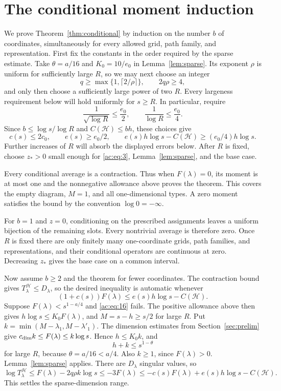 \section{The conditional moment induction}\label{sec:induction}
\label{ac:part:148}


We prove Theorem~\ref{thm:conditional} by induction on the number \(b\)
of coordinates, simultaneously for every allowed grid, path family, and
representation. First fix the constants in the order required by the
sparse estimate. Take \(\theta=a/16\) and \(K_0=10/e_0\) in
Lemma~\ref{lem:sparse}. Its exponent \(\rho\) is uniform for sufficiently
large \(R\), so we may next choose an integer
\[
 q\ge\max\{1,\lceil2/\rho\rceil\},\qquad 2q\rho\ge4,
\]
and only then choose a sufficiently large power of two \(R\). Every
largeness requirement below will hold uniformly for \(s\ge R\). In
particular, require
\[
 \frac1{\sqrt{\log R}}\le\frac{e_0}{2},
 \qquad
 \frac1{\log R}\le\frac{e_0}{4}.
\]
Since \(b\le\log s/\log R\) and \(C(\mathcal H)\le bh\), these choices give
\[
 c(s)\le2c_0,\qquad e(s)\ge e_0/2,\qquad
 e(s)h\log s-C(\mathcal H)\ge(e_0/4)h\log s.
\]
Further increases of \(R\) will absorb the displayed errors below.
After \(R\) is fixed, choose \(z_*>0\) small enough for
\eqref{ac:eq:3}, Lemma~\ref{lem:sparse}, and the base case.

Every conditional average is a contraction. Thus when \(F(\lambda)=0\),
its moment is at most one and the nonnegative allowance above proves the
theorem. This covers the empty diagram, \(M=1\), and all one-dimensional
types. A zero moment satisfies the bound by the convention
\(\log0=-\infty\).

For \(b=1\) and \(z=0\), conditioning on the prescribed assignments
leaves a uniform bijection of the remaining slots. Every nontrivial
average is therefore zero. Once \(R\) is fixed there are only finitely
many one-coordinate grids, path families, and representations, and their
conditional operators are continuous at zero. Decreasing \(z_*\) gives
the base case on a common interval.

Now assume \(b\ge2\) and the theorem for fewer coordinates. The contraction
bound gives \(T_\lambda^{\mathcal H}\le D_\lambda\), so the desired
inequality is automatic whenever
\begin{equation}
 (1+c(s))F(\lambda)\le e(s)h\log s-C(\mathcal H).
 \label{ac:eq:16}
\end{equation}
Suppose \(F(\lambda)<s^{1-a/4}\) and \eqref{ac:eq:16} fails. The positive
allowance above then gives
\(h\log s\le K_0F(\lambda)\), and \(M=s-h\ge s/2\) for large \(R\).
Put \(k=\min(M-\lambda_1,M-\lambda'_1)\). The dimension estimates from
Section~\ref{sec:prelim} give
\(c_{\rm dim}k\le F(\lambda)\le k\log s\). Hence \(h\le K_0k\), and
\[
 h+k\le s^{1-\theta}
\]
for large \(R\), because \(\theta=a/16<a/4\). Also \(k\ge1\), since
\(F(\lambda)>0\). Lemma~\ref{lem:sparse} applies. There are
\(D_\lambda\) singular values, so
\[
 \log T_\lambda^{\mathcal H}
 \le F(\lambda)-2q\rho k\log s
 \le-3F(\lambda)
 \le-c(s)F(\lambda)+e(s)h\log s-C(\mathcal H).
\]
This settles the sparse-dimension range.

